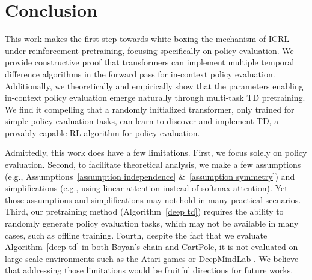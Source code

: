 \documentclass{article}
\newcommand{\newtext}[1]{{#1}}
\begin{document}
\section{Conclusion}

This work makes the first step towards white-boxing the mechanism of ICRL under reinforcement pretraining, focusing specifically on policy evaluation. 
We provide constructive proof that transformers can implement multiple temporal difference algorithms in the forward pass for in-context policy evaluation. 
Additionally, we theoretically and empirically show that the parameters enabling in-context policy evaluation emerge naturally through multi-task TD pretraining.
We find it compelling that a randomly initialized transformer, only trained for simple policy evaluation tasks, can learn to discover and implement TD, a provably capable RL algorithm for policy evaluation.

\newtext{Admittedly, this work does have a few limitations.
First, we focus solely on policy evaluation.
Second,
to facilitate theoretical analysis,
we make a few assumptions (e.g., Assumptions~\ref{assumption independence} \&~\ref{assumption symmetry}) and simplifications (e.g., using linear attention instead of softmax attention).
Yet those assumptions and simplifications may not hold in many practical scenarios.
Third,
our pretraining method (Algorithm~\ref{deep td}) requires the ability to randomly generate policy evaluation tasks,
which may not be available in many cases, such as offline training.
Fourth,
despite the fact that we evaluate Algorithm~\ref{deep td} in both Boyan's chain and CartPole,
it is not evaluated on large-scale environments such as the Atari games \citep{bellemare13arcade} or DeepMindLab \citep{beattie2016deepmind}.
We believe that addressing those limitations would be fruitful directions for future works.}
\end{document}
